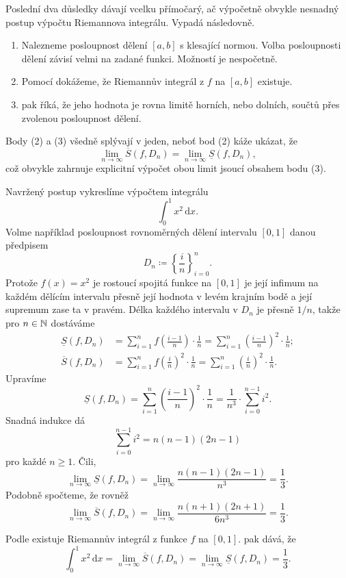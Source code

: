 \begin{example}{}{}
 Poslední dva důsledky dávají vcelku přímočarý, ač výpočetně obvykle nesnadný
 postup výpočtu Riemannova integrálu. Vypadá následovně.
 \begin{enumerate}
  \item Nalezneme posloupnost dělení $[a,b]$ s klesající normou. Volba
    posloupnosti dělení závisí velmi na zadané funkci. Možností je
   nespočetně.
  \item Pomocí  dokážeme, že Riemannův
   integrál z $f$ na $[a,b]$ existuje.
  \item {} pak říká, že jeho hodnota je rovna
   limitě horních, nebo dolních, součtů přes zvolenou posloupnost dělení.
 \end{enumerate}
 Body (2) a (3) všedně splývají v jeden, neboť bod (2) káže ukázat, že
 \[
  \lim_{n \to \infty} \overline{S}(f,D_n) = \lim_{n \to \infty}
  \underline{S}(f,D_n),
 \]
 což obvykle zahrnuje explicitní výpočet obou limit jsoucí obsahem bodu (3).

 Navržený postup vykreslíme výpočtem integrálu
 \[
  \int_{0}^{1} x^2 \, \mathrm{d}x.
 \]
 Volme například posloupnost rovnoměrných dělení intervalu $[0,1]$ danou
 předpisem
 \[
  D_n \coloneqq \left\{\frac{i}{n}\right\}_{i=0}^n.
 \]
 Protože $f(x) = x^2$ je rostoucí spojitá funkce na $[0,1]$ je její infimum na
 každém dělícím intervalu přesně její hodnota v levém krajním bodě a její
 supremum zase ta v pravém. Délka každého intervalu v $D_n$ je přesně $1 / n$,
 takže pro $n \in \mathbb{N}$ dostáváme
 \begin{align*}
  \underline{S}(f,D_n) &= \sum_{i=1}^{n} f \left( \frac{i-1}{n} \right) \cdot
  \frac{1}{n} = \sum_{i=1}^{n} \left( \frac{i-1}{n} \right)^2 \cdot
  \frac{1}{n};\\
  \overline{S}(f,D_n) &= \sum_{i=1}^{n} f \left( \frac{i}{n} \right)^2 \cdot
  \frac{1}{n} = \sum_{i=1}^{n} \left( \frac{i}{n} \right)^2 \cdot \frac{1}{n}.
 \end{align*}
 Upravíme
 \[
  \underline{S}(f,D_n) = \sum_{i = 1}^{n} \left( \frac{i-1}{n} \right)^2 \cdot
  \frac{1}{n} = \frac{1}{n^3} \cdot \sum_{i=0}^{n-1} i^2.
 \]
 Snadná indukce dá
 \[
  \sum_{i=0}^{n-1} i^2 = n(n-1)(2n-1)
 \]
 pro každé $n \geq 1$. Čili,
 \[
  \lim_{n \to \infty} \underline{S}(f,D_n) = \lim_{n \to \infty}
  \frac{n(n-1)(2n-1)}{n^3} = \frac{1}{3}.
 \]
 Podobně spočteme, že rovněž
 \[
  \lim_{n \to \infty} \overline{S}(f,D_n) = \lim_{n \to \infty}
  \frac{n(n+1)(2n+1)}{6n^3} = \frac{1}{3}.
 \]
 
 Podle  existuje Riemannův integrál z
 funkce $f$ na $[0,1]$.  pak dává, že
 \[
  \int_{0}^{1} x^2 \, \mathrm{d}x = \lim_{n \to \infty} \overline{S}(f,D_n) =
  \lim_{n \to \infty} \underline{S}(f,D_n) = \frac{1}{3}.
 \]
\end{example}

